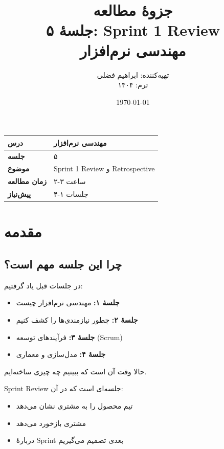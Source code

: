 \documentclass[12pt, a4paper]{article}
\title{
    \vspace{-1cm}
    \textbf{\Huge جزوهٔ مطالعه}\\[0.3cm]
    \textbf{\LARGE جلسهٔ ۵: Sprint 1 Review}\\[0.5cm]
    \large مهندسی نرم‌افزار
}
\author{
    تهیه‌کننده: ابراهیم فضلی\\
    ترم: ۱۴۰۴
}
\date{\today}
\begin{document}
\maketitle
\thispagestyle{empty}

\vspace{1cm}

\begin{center}
\begin{tabular}{|l|l|}
\hline
\textbf{درس} & مهندسی نرم‌افزار \\
\hline
\textbf{جلسه} & ۵ \\
\hline
\textbf{موضوع} & Sprint 1 Review و Retrospective \\
\hline
\textbf{زمان مطالعه} & ۲-۳ ساعت \\
\hline
\textbf{پیش‌نیاز} & جلسات ۱-۴ \\
\hline
\end{tabular}
\end{center}

\newpage
\tableofcontents
\newpage

\section{مقدمه}

\subsection{چرا این جلسه مهم است؟}
در جلسات قبل یاد گرفتیم:
\begin{itemize}
    \item \textbf{جلسهٔ ۱:} مهندسی نرم‌افزار چیست
    \item \textbf{جلسهٔ ۲:} چطور نیازمندی‌ها را کشف کنیم
    \item \textbf{جلسهٔ ۳:} فرآیندهای توسعه (Scrum)
    \item \textbf{جلسهٔ ۴:} مدل‌سازی و معماری
\end{itemize}

حالا وقت آن است که ببینیم چه چیزی ساخته‌ایم.

Sprint Review جلسه‌ای است که در آن:
\begin{itemize}
    \item تیم محصول را به مشتری نشان می‌دهد
    \item مشتری بازخورد می‌دهد
    \item دربارهٔ Sprint بعدی تصمیم می‌گیریم
\end{itemize}
\end{document}
